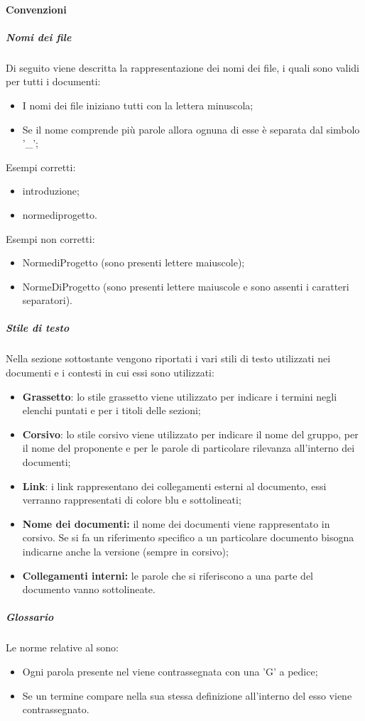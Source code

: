 \paragraph{Convenzioni}
\subparagraph{Nomi dei file}
Di seguito viene descritta la rappresentazione dei nomi dei file, i quali sono validi per tutti i documenti:
\begin{itemize}
\item I nomi dei file iniziano tutti con la lettera minuscola;
\item Se il nome comprende più parole allora ognuna di esse è separata dal simbolo '\_';
\end {itemize}
Esempi corretti:
\begin{itemize}
\item introduzione;
\item norme\textunderscore di\textunderscore progetto.
\end {itemize}
Esempi non corretti:
\begin{itemize}
\item Norme\textunderscore di\textunderscore Progetto (sono presenti lettere maiuscole);
\item NormeDiProgetto (sono presenti lettere maiuscole e sono assenti i caratteri separatori).
\end {itemize}

\subparagraph{Stile di testo}
Nella sezione sottostante vengono riportati i vari stili di testo utilizzati nei documenti e i contesti in cui essi sono utilizzati:
\begin {itemize}
\item \textbf{Grassetto}: lo stile grassetto viene utilizzato per indicare i termini negli elenchi puntati e per i titoli delle sezioni;
\item \textbf{Corsivo}: lo stile corsivo viene utilizzato per indicare il nome del gruppo, per il nome del proponente e per le parole di particolare rilevanza all'interno dei documenti;
\item \textbf{Link}: i link rappresentano dei collegamenti esterni al documento, essi verranno rappresentati di colore blu e sottolineati;
\item \textbf{Nome dei documenti:} il nome dei documenti viene rappresentato in corsivo. Se si fa un riferimento specifico a un particolare documento bisogna indicarne anche la versione (sempre in corsivo);
\item \textbf{Collegamenti interni:} le parole che si riferiscono a una parte del documento vanno sottolineate.
\end {itemize}
\subparagraph{Glossario}
Le norme relative al \docNameGloLow{} sono:
\begin{itemize}
    \item Ogni parola presente nel \docNameGloLow{} viene contrassegnata con una 'G' a pedice;
    \item Se un termine compare nella sua stessa definizione all'interno del \docNameGloLow{} esso viene contrassegnato.
\end{itemize}

